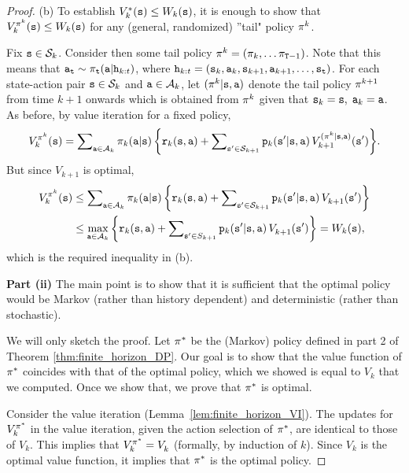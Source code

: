 \begin{proof}
(b) To establish $V_k^{*}({\tt s}) \le {W_k}({\tt s})$, it is enough
to show that $V_k^{{\pi ^k}}({\tt s}) \le {W_k}({\tt s})$ for any
(general, randomized) ''tail" policy ${\pi ^k}$.

Fix ${\tt s} \in {\mathcal{S}_k}$. Consider then some tail policy ${\pi ^k} =
({\pi _k}, \ldots {\pi_{{\tt T}-1}})$. Note that this
means that ${{\tt a}_{\tt t}} \sim {\pi_{\tt t}}({\tt a}|{{\tt h}_{k:t}})$, where ${{\tt h}_{k:t}} =
({{\tt s}_k},{{\tt a}_k},{{\tt s}_{k + 1}},{{\tt a}_{k + 1}}, \ldots
,{{\tt s}_{\tt t}})$. For each state-action pair ${\tt s} \in
{\mathcal{S}_k}$ and ${\tt a} \in {\mathcal{A}_k}$, let $({\pi
^k}|{\tt s},{\tt a})$ denote the tail policy ${\pi ^{k + 1}}$
from time $k + 1$ onwards which is obtained from ${\pi ^k}$
given that ${{\tt s}_k} = {\tt s},\;{{\tt a}_k} = {\tt a}$. As before,
by value iteration for a fixed policy,
\[V_k^{{\pi ^k}}({\tt s}) = \sum\nolimits_{{\tt a} \in {\mathcal{A}_k}} {{\pi _k}({\tt a}|{\tt s})\left\{ {{{\tt r}_k}({\tt s},{\tt a}) + \sum\nolimits_{{\tt s}' \in {\mathcal{S}_{k + 1}}} {{{\tt p}_k}({\tt s}'|{\tt s},{\tt a})} \,V_{k + 1}^{({\pi ^k}|{\tt s},{\tt a})}({\tt s}')} \right\}} .\]
But since $V_{k + 1}^{}$ is optimal,
\begin{align*}
V_k^{{\pi ^k}}({\tt s}) &\le \sum\nolimits_{{\tt a} \in {\mathcal{A}_k}} {{\pi _k}({\tt a}|{\tt s})\left\{ {{{\tt r}_k}({\tt s},{\tt a}) + \sum\nolimits_{{\tt s}' \in {\mathcal{S}_{k + 1}}} {{{\tt p}_k}({\tt s}'|{\tt s},{\tt a})\,} V_{k + 1}^{}({\tt s}')} \right\}} \\
 &\le {\max _{{\tt a}\in {\mathcal{A}_k}}}\left\{ {{{\tt r}_k}({\tt s},{\tt a}) + \sum\nolimits_{{\tt s}' \in {S_{k + 1}}} {{{\tt p}_k}({\tt s}'|{\tt s},{\tt a})\,} V_{k + 1}^{}({\tt s}')} \right\} = {W_k}({\tt s}),
\end{align*}
which is the required inequality in (b).

\textbf{Part  (ii)} The main point is to show that it is
sufficient that the optimal policy would be Markov (rather than
history dependent) and deterministic (rather than stochastic).


We will only sketch the proof.
Let ${\pi ^*}$ be the (Markov) policy defined in part 2 of
Theorem \ref{thm:finite_horizon_DP}. Our goal is to show that the
value function of ${\pi ^*}$ coincides with that of the optimal
policy, which we showed is equal to $V_k$ that we computed. Once we
show that, we prove that ${\pi ^*}$ is optimal.

Consider the value iteration (Lemma~\ref{lem:finite_horizon_VI}).
The updates for $V_k^{{\pi ^*}}$ in the value iteration, given
the action selection of $\pi^*$, are identical to those of
$V_k^{}$. This implies that $V_k^{{\pi ^*}} = V_k^{}$ (formally,
by induction of $k$). Since $V_k$ is the optimal value function, it
implies that $\pi^*$ is the optimal policy.
%
\end{proof}



